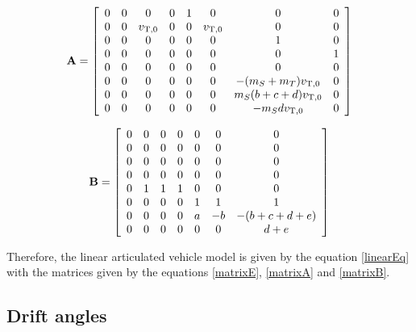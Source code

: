 \documentclass[sublist]{fei}
\begin{document}
\begin{equation} \label{matrixA}
{\bf A} = \left[ \begin{array}{cccccccc} 0 & 0 &  0 & 0 & 1 &  0 &                 0 & 0 \\
                                0 & 0 & v_{{\rm T},0} & 0 & 0 & v_{{\rm T},0} &                 0 & 0 \\
                                0 & 0 &  0 & 0 & 0 &  0 &                 1 & 0 \\
                                0 & 0 &  0 & 0 & 0 &  0 &                 0 & 1 \\
                                0 & 0 &  0 & 0 & 0 &  0 &                 0 & 0 \\
                                0 & 0 &  0 & 0 & 0 &  0 &     -(m_S + m_T) v_{{\rm T},0} & 0 \\
                                0 & 0 &  0 & 0 & 0 &  0 & m_S (b + c + d) v_{{\rm T},0} & 0 \\
                                0 & 0 &  0 & 0 & 0 &  0 &          - m_S d v_{{\rm T},0} & 0 \end{array} \right]
\end{equation}

\begin{equation} \label{matrixB}
    {\bf B} = \left[ \begin{array}{cccccccc}
0 & 0 & 0 & 0 & 0 &  0 &               0 \\
0 & 0 & 0 & 0 & 0 &  0 &               0 \\
0 & 0 & 0 & 0 & 0 &  0 &               0 \\
0 & 0 & 0 & 0 & 0 &  0 &               0 \\
0 & 1 & 1 & 1 & 0 &  0 &               0 \\
0 & 0 & 0 & 0 & 1 &  1 &               1 \\
0 & 0 & 0 & 0 & a & - b & - (b + c + d + e) \\
0 & 0 & 0 & 0 & 0 &  0 &           d + e \end{array} \right]
\end{equation}

Therefore, the linear articulated vehicle model is given by the equation \eqref{linearEq} with the matrices given by the equations \eqref{matrixE}, \eqref{matrixA} and \eqref{matrixB}.

\subsection{Drift angles}
\end{document}
